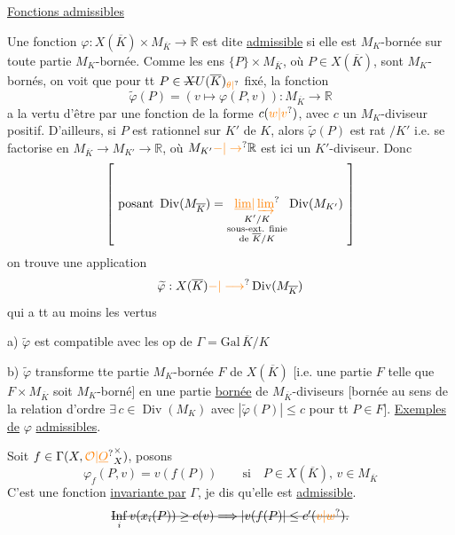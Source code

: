 \uline{Fonctions admissibles}

Une fonction $\varphi:X(\overline K)\times M_{\overline K}\longrightarrow\mathbb R$ est dite \uline{admissible} si elle est  $M_K$-bornée sur toute partie $M_K$-bornée. Comme les ens $\{P\}\times M_{\overline K}$, où $P\in X(\overline K)$, sont $M_K$-bornés, on voit que  pour tt $P\in\deleted{X}U(\overline K)_{\unsure{\theta|{}}}$ fixé, la fonction
\[
\widetilde{\varphi}(P)=(v\mapsto\varphi(P,v)):M_{\overline K}\longrightarrow\mathbb R
\]
a la vertu d'être   par une fonction de la forme $c(\unsure{w|v})$, avec
$c$ un $M_K$-diviseur positif. D'ailleurs,  si $P$ est rationnel sur  $K'$ de $K$, alors $\widetilde{\varphi}(P)$ est rat $/K'$ i.e. se factorise en $M_{\overline K}\longrightarrow M_{K'}\longrightarrow\mathbb R$, où $M_{K'}\unsure{-|\to}\mathbb R$ est ici un $K'$-diviseur. Donc
\[
\left[\ \text{posant }\operatorname{Div}(M_{\overline K})=
\underset{\substack{K'/K\\\text{sous-ext. finie}\\\text{de }\overline K/K}}{\unsure{\underline{\lim}|\varinjlim}}
\operatorname{Div}(M_{K'})\ \right]
\]
on trouve une application
\[
\widetilde{\varphi}:X(\overline K)\unsure{-|\longrightarrow}\operatorname{Div}(M_{\overline K})
\]
qui a tt au moins les vertus 

a) $\widetilde{\varphi}$ est compatible avec les op de $\Gamma=\mathrm{Gal}\,\overline K/K$

b) $\widetilde{\varphi}$ transforme tte partie $M_K$-bornée $F$ de $X(\overline K)$ [i.e. une partie $F$ telle que $F\times M_{\overline K}$ soit $M_K$-borné] en une partie \uline{bornée} de $M_{\overline K}$-diviseurs [bornée au sens de la relation d'ordre  $\exists\,c\in\operatorname{Div}(M_K)$ avec $|\widetilde{\varphi}(P)|\leq c$ pour tt $P\in F$].
\uline{Exemples de} $\varphi$ \uline{admissibles}.

Soit $f\in\Gamma(X,\unsure{\mathcal O|\underline O}_X^{\times})$, posons
\[
\varphi_f(P,v)=v(f(P))\qquad\text{si}\quad P\in X(\overline K),\,v\in M_{\overline K}
\]
C'est une fonction \uline{invariante par} $\Gamma$, je dis qu'elle est \uline{admissible}. 
\[
\deleted{\mathop{\mathrm{Inf}}\limits_i v(x_i(P))\geq c(v)\Longrightarrow |v(f(P)|\leq c'(\unsure{v|w}).}
\]

